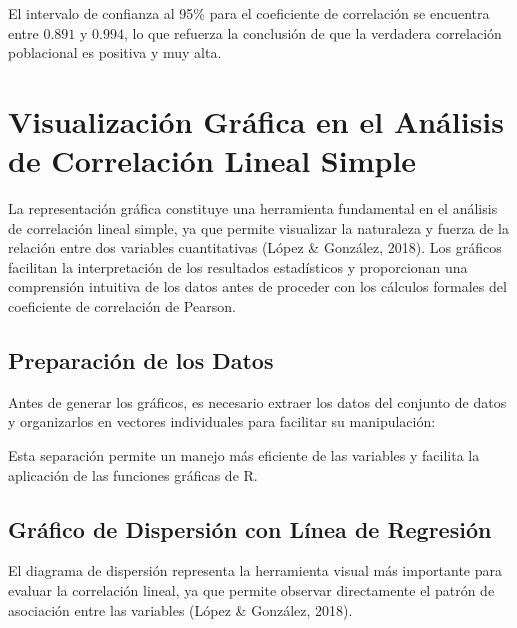 \documentclass[
  spanish,
  letterpaper,
]{book}
\newenvironment{Shaded}{\begin{snugshade}}{\end{snugshade}}
\newcommand{\CommentTok}[1]{\textcolor[rgb]{0.37,0.37,0.37}{#1}}
\newcommand{\NormalTok}[1]{\textcolor[rgb]{0.00,0.23,0.31}{#1}}
\newcommand{\OtherTok}[1]{\textcolor[rgb]{0.00,0.23,0.31}{#1}}
\newcommand{\SpecialCharTok}[1]{\textcolor[rgb]{0.37,0.37,0.37}{#1}}
\begin{document}
El intervalo de confianza al 95\% para el coeficiente de correlación se
encuentra entre \(0.891\) y \(0.994\), lo que refuerza la conclusión de
que la verdadera correlación poblacional es positiva y muy alta.

\section{Visualización Gráfica en el Análisis de Correlación Lineal
Simple}\label{visualizaciuxf3n-gruxe1fica-en-el-anuxe1lisis-de-correlaciuxf3n-lineal-simple}

La representación gráfica constituye una herramienta fundamental en el
análisis de correlación lineal simple, ya que permite visualizar la
naturaleza y fuerza de la relación entre dos variables cuantitativas
(López \& González, 2018). Los gráficos facilitan la interpretación de
los resultados estadísticos y proporcionan una comprensión intuitiva de
los datos antes de proceder con los cálculos formales del coeficiente de
correlación de Pearson.

\subsection{Preparación de los Datos}\label{preparaciuxf3n-de-los-datos}

Antes de generar los gráficos, es necesario extraer los datos del
conjunto de datos y organizarlos en vectores individuales para facilitar
su manipulación:

\begin{Shaded}
\end{Shaded}

Esta separación permite un manejo más eficiente de las variables y
facilita la aplicación de las funciones gráficas de R.

\subsection{Gráfico de Dispersión con Línea de
Regresión}\label{gruxe1fico-de-dispersiuxf3n-con-luxednea-de-regresiuxf3n}

El diagrama de dispersión representa la herramienta visual más
importante para evaluar la correlación lineal, ya que permite observar
directamente el patrón de asociación entre las variables (López \&
González, 2018).
\end{document}
